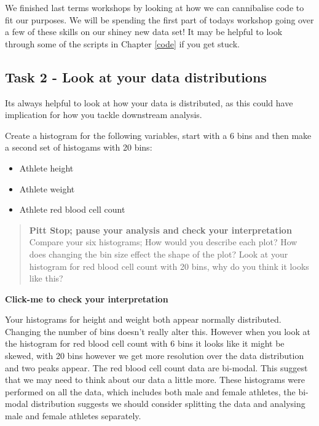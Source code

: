 \documentclass[
]{book}
\providecommand{\tightlist}{%
  \setlength{\itemsep}{0pt}\setlength{\parskip}{0pt}}
\begin{document}
We finished last terms workshops by looking at how we can cannibalise code to fit our purposes. We will be spending the first part of todays workshop going over a few of these skills on our shiney new data set! It may be helpful to look through some of the scripts in Chapter \ref{code} if you get stuck.

\hypertarget{task-2---look-at-your-data-distributions}{%
\subsection{Task 2 - Look at your data distributions}\label{task-2---look-at-your-data-distributions}}

Its always helpful to look at how your data is distributed, as this could have implication for how you tackle downstream analysis.

Create a histogram for the following variables, start with a 6 bins and then make a second set of histogams with 20 bins:

\begin{itemize}
\tightlist
\item
  Athlete height
\item
  Athlete weight
\item
  Athlete red blood cell count
\end{itemize}

\begin{quote}
\textbf{Pitt Stop; pause your analysis and check your interpretation}
Compare your six histograms;
How would you describe each plot?
How does changing the bin size effect the shape of the plot?
Look at your histogram for red blood cell count with 20 bins, why do you think it looks like this?
\end{quote}

\textbf{Click-me to check your interpretation}

Your histograms for height and weight both appear normally distributed. Changing the number of bins doesn't really alter this. However when you look at the histogram for red blood cell count with 6 bins it looks like it might be skewed, with 20 bins however we get more resolution over the data distribution and two peaks appear. The red blood cell count data are bi-modal. This suggest that we may need to think about our data a little more. These histograms were performed on all the data, which includes both male and female athletes, the bi-modal distribution suggests we should consider splitting the data and analysing male and female athletes separately.
\end{document}
